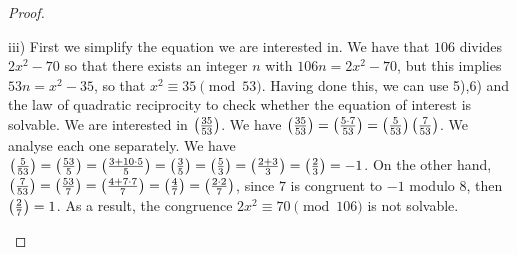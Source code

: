 \begin{proof}
\begin{enumerate}
     iii) First we simplify the equation we are interested in. We have that $106$ divides $2x^{2}-70$ so that there exists an integer $n$ with $106n=2x^{2}-70$, but this implies $53n=x^{2}-35$, so that $x^{2}\equiv 35\pmod{53}$. Having done this, we can use 5),6) and the law of quadratic reciprocity to check whether the equation of interest is solvable. We are interested in $\left( \frac{35}{53}\right)$. We have $\left( \frac{35}{53}\right)= \left( \frac{5\cdot 7}{53}\right)= \left( \frac{5}{53}\right)\left( \frac{7}{53}\right)$. We analyse each one separately. We have  $\left( \frac{5}{53}\right)= \left( \frac{53}{5}\right)= \left( \frac{3+10\cdot 5}{5}\right)= \left( \frac{3}{5}\right)= \left( \frac{5}{3}\right)= \left( \frac{2+3}{3}\right)= \left( \frac{2}{3}\right)= -1$. On the other hand, $\left( \frac{7}{53}\right)= \left( \frac{53}{7}\right)= \left( \frac{4+7\cdot 7}{7}\right)= \left( \frac{4}{7}\right)= \left( \frac{2\cdot 2}{7}\right)$, since $7$ is congruent to $-1$ modulo $8$, then $\left( \frac{2}{7}\right)=1$. As a result, the congruence $2x^{2}\equiv 70\pmod{106}$ is not solvable.
 \end{enumerate}
\end{proof}


